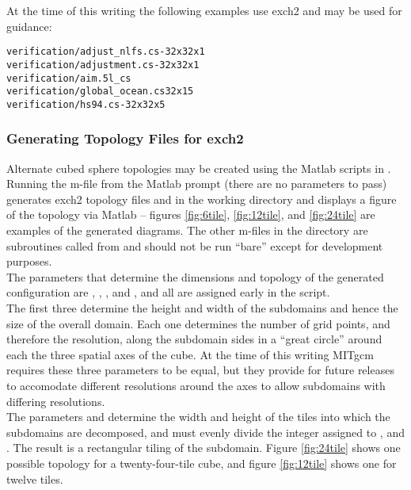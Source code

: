 At the time of this writing the following examples use exch2 and may
be used for guidance:

\begin{verbatim}
verification/adjust_nlfs.cs-32x32x1
verification/adjustment.cs-32x32x1 
verification/aim.5l_cs
verification/global_ocean.cs32x15
verification/hs94.cs-32x32x5
\end{verbatim}




\subsubsection{Generating Topology Files for exch2}
\label{sec:topogen}

Alternate cubed sphere topologies may be created using the Matlab
scripts in . Running the
m-file
from the Matlab prompt (there are no parameters to pass) generates
exch2 topology files  and
 in the working directory and displays a figure of
the topology via Matlab -- figures \ref{fig:6tile}, \ref{fig:12tile}, 
and \ref{fig:24tile} are examples of the generated diagrams.  The other 
m-files in the directory are
subroutines called from  and should not be run ``bare'' except
for development purposes. \\

The parameters that determine the dimensions and topology of the
generated configuration are , , ,
 and , and all are assigned early in the script. \\

The first three determine the height and width of the subdomains and
hence the size of the overall domain.  Each one determines the number
of grid points, and therefore the resolution, along the subdomain
sides in a ``great circle'' around each the three spatial axes of the cube.  At the time
of this writing MITgcm requires these three parameters to be equal,
but they provide for future releases  to accomodate different
resolutions around the axes to allow subdomains with differing resolutions.\\

The parameters  and  determine the width and height of
the tiles into which the subdomains are decomposed, and must evenly
divide the integer assigned to ,  and .
The result is a rectangular tiling of the subdomain.  Figure
\ref{fig:24tile} shows one possible topology for a twenty-four-tile
cube, and figure \ref{fig:12tile} shows one for twelve tiles. \\


